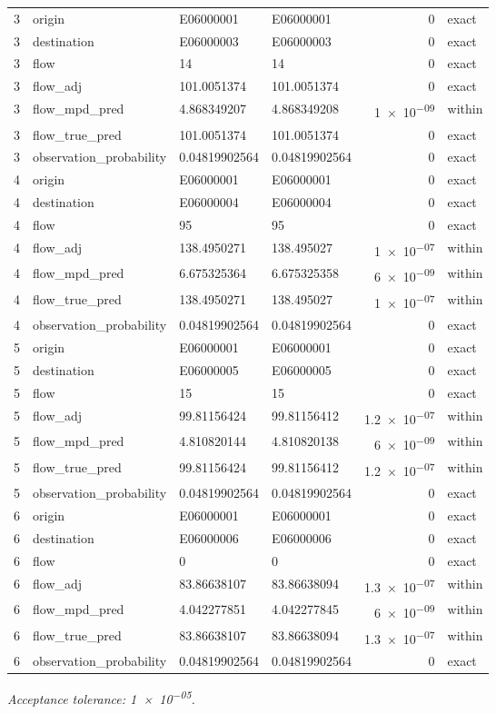 \documentclass[10pt]{article}
\begin{document}
\begin{longtable}{@{}r p{}p{}p{}rl@{}}
3 & origin & E06000001 & E06000001 & 0 & exact \\
3 & destination & E06000003 & E06000003 & 0 & exact \\
3 & flow & 14 & 14 & 0 & exact \\
3 & flow\_\allowbreak{}adj & 101.0051374 & 101.0051374 & 0 & exact \\
3 & flow\_\allowbreak{}mpd\_\allowbreak{}pred & 4.868349207 & 4.868349208 & \num{1e-09} & within \\
3 & flow\_\allowbreak{}true\_\allowbreak{}pred & 101.0051374 & 101.0051374 & 0 & exact \\
3 & observation\_\allowbreak{}probability & 0.04819902564 & 0.04819902564 & 0 & exact \\
4 & origin & E06000001 & E06000001 & 0 & exact \\
4 & destination & E06000004 & E06000004 & 0 & exact \\
4 & flow & 95 & 95 & 0 & exact \\
4 & flow\_\allowbreak{}adj & 138.4950271 & 138.495027 & \num{1e-07} & within \\
4 & flow\_\allowbreak{}mpd\_\allowbreak{}pred & 6.675325364 & 6.675325358 & \num{6e-09} & within \\
4 & flow\_\allowbreak{}true\_\allowbreak{}pred & 138.4950271 & 138.495027 & \num{1e-07} & within \\
4 & observation\_\allowbreak{}probability & 0.04819902564 & 0.04819902564 & 0 & exact \\
5 & origin & E06000001 & E06000001 & 0 & exact \\
5 & destination & E06000005 & E06000005 & 0 & exact \\
5 & flow & 15 & 15 & 0 & exact \\
5 & flow\_\allowbreak{}adj & 99.81156424 & 99.81156412 & \num{1.2e-07} & within \\
5 & flow\_\allowbreak{}mpd\_\allowbreak{}pred & 4.810820144 & 4.810820138 & \num{6e-09} & within \\
5 & flow\_\allowbreak{}true\_\allowbreak{}pred & 99.81156424 & 99.81156412 & \num{1.2e-07} & within \\
5 & observation\_\allowbreak{}probability & 0.04819902564 & 0.04819902564 & 0 & exact \\
6 & origin & E06000001 & E06000001 & 0 & exact \\
6 & destination & E06000006 & E06000006 & 0 & exact \\
6 & flow & 0 & 0 & 0 & exact \\
6 & flow\_\allowbreak{}adj & 83.86638107 & 83.86638094 & \num{1.3e-07} & within \\
6 & flow\_\allowbreak{}mpd\_\allowbreak{}pred & 4.042277851 & 4.042277845 & \num{6e-09} & within \\
6 & flow\_\allowbreak{}true\_\allowbreak{}pred & 83.86638107 & 83.86638094 & \num{1.3e-07} & within \\
6 & observation\_\allowbreak{}probability & 0.04819902564 & 0.04819902564 & 0 & exact \\
\bottomrule
\end{longtable}
\normalsize
\textit{Acceptance tolerance: \num{1e-05}.}
\end{document}
